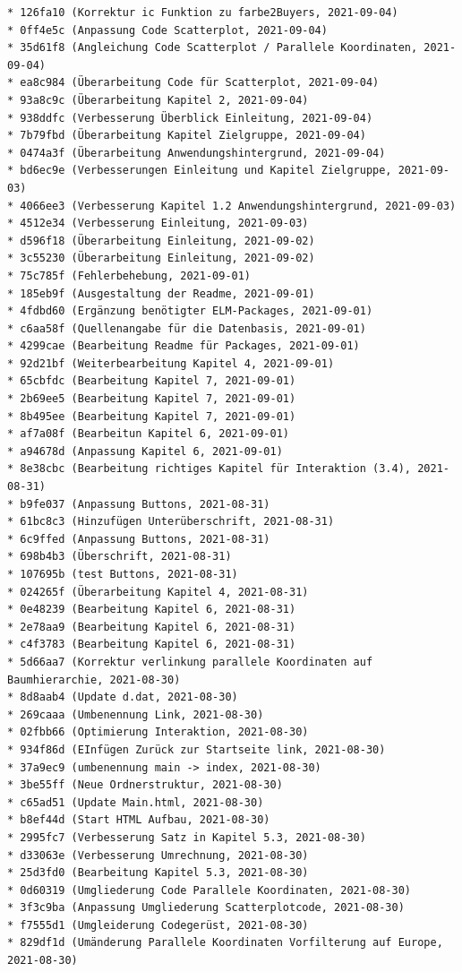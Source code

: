 \documentclass[usegeometry=true]{scrartcl}
\begin{document}
\begin{verbatim}
* 126fa10 (Korrektur ic Funktion zu farbe2Buyers, 2021-09-04)
* 0ff4e5c (Anpassung Code Scatterplot, 2021-09-04)
* 35d61f8 (Angleichung Code Scatterplot / Parallele Koordinaten, 2021-09-04)
* ea8c984 (Überarbeitung Code für Scatterplot, 2021-09-04)
* 93a8c9c (Überarbeitung Kapitel 2, 2021-09-04)
* 938ddfc (Verbesserung Überblick Einleitung, 2021-09-04)
* 7b79fbd (Überarbeitung Kapitel Zielgruppe, 2021-09-04)
* 0474a3f (Überarbeitung Anwendungshintergrund, 2021-09-04)
* bd6ec9e (Verbesserungen Einleitung und Kapitel Zielgruppe, 2021-09-03)
* 4066ee3 (Verbesserung Kapitel 1.2 Anwendungshintergrund, 2021-09-03)
* 4512e34 (Verbesserung Einleitung, 2021-09-03)
* d596f18 (Überarbeitung Einleitung, 2021-09-02)
* 3c55230 (Überarbeitung Einleitung, 2021-09-02)
* 75c785f (Fehlerbehebung, 2021-09-01)
* 185eb9f (Ausgestaltung der Readme, 2021-09-01)
* 4fdbd60 (Ergänzung benötigter ELM-Packages, 2021-09-01)
* c6aa58f (Quellenangabe für die Datenbasis, 2021-09-01)
* 4299cae (Bearbeitung Readme für Packages, 2021-09-01)
* 92d21bf (Weiterbearbeitung Kapitel 4, 2021-09-01)
* 65cbfdc (Bearbeitung Kapitel 7, 2021-09-01)
* 2b69ee5 (Bearbeitung Kapitel 7, 2021-09-01)
* 8b495ee (Bearbeitung Kapitel 7, 2021-09-01)
* af7a08f (Bearbeitun Kapitel 6, 2021-09-01)
* a94678d (Anpassung Kapitel 6, 2021-09-01)
* 8e38cbc (Bearbeitung richtiges Kapitel für Interaktion (3.4), 2021-08-31)
* b9fe037 (Anpassung Buttons, 2021-08-31)
* 61bc8c3 (Hinzufügen Unterüberschrift, 2021-08-31)
* 6c9ffed (Anpassung Buttons, 2021-08-31)
* 698b4b3 (Überschrift, 2021-08-31)
* 107695b (test Buttons, 2021-08-31)
* 024265f (Überarbeitung Kapitel 4, 2021-08-31)
* 0e48239 (Bearbeitung Kapitel 6, 2021-08-31)
* 2e78aa9 (Bearbeitung Kapitel 6, 2021-08-31)
* c4f3783 (Bearbeitung Kapitel 6, 2021-08-31)
* 5d66aa7 (Korrektur verlinkung parallele Koordinaten auf Baumhierarchie, 2021-08-30)
* 8d8aab4 (Update d.dat, 2021-08-30)
* 269caaa (Umbenennung Link, 2021-08-30)
* 02fbb66 (Optimierung Interaktion, 2021-08-30)
* 934f86d (EInfügen Zurück zur Startseite link, 2021-08-30)
* 37a9ec9 (umbenennung main -> index, 2021-08-30)
* 3be55ff (Neue Ordnerstruktur, 2021-08-30)
* c65ad51 (Update Main.html, 2021-08-30)
* b8ef44d (Start HTML Aufbau, 2021-08-30)
* 2995fc7 (Verbesserung Satz in Kapitel 5.3, 2021-08-30)
* d33063e (Verbesserung Umrechnung, 2021-08-30)
* 25d3fd0 (Bearbeitung Kapitel 5.3, 2021-08-30)
* 0d60319 (Umgliederung Code Parallele Koordinaten, 2021-08-30)
* 3f3c9ba (Anpassung Umgliederung Scatterplotcode, 2021-08-30)
* f7555d1 (Umgleiderung Codegerüst, 2021-08-30)
* 829df1d (Umänderung Parallele Koordinaten Vorfilterung auf Europe, 2021-08-30)

\end{verbatim}
\end{document}
